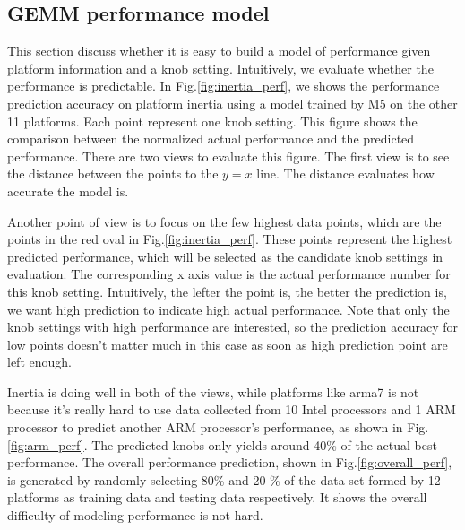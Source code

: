   \subsection{GEMM performance model}
  \label{sec:GEMMperf}
  This section discuss whether it is easy to build a model of \gem performance
  given platform information and a knob setting. Intuitively, we evaluate
  whether the \gem performance is predictable. In Fig.\ref{fig:inertia_perf},
  we shows the performance prediction accuracy on platform inertia using a model
  trained by M5 on the other 11 platforms. Each point represent one knob
  setting. This figure shows the comparison between the normalized actual
  performance and the predicted performance. There are two views to evaluate
  this figure. The first view is to see the distance between the points to the
  $y=x$ line. The distance evaluates how accurate the model is.

  Another point of
  view is to focus on the few highest data points, which are the points in the
  red oval in Fig.\ref{fig:inertia_perf}. These points represent the highest
  predicted performance, which will be selected as the candidate knob settings
  in \atl evaluation. The corresponding x axis value is the actual performance
  number for this knob setting. Intuitively, the lefter the point is, the
  better the prediction is, we want high prediction to indicate high actual
  performance. Note that only the knob settings with high performance are
  interested, so the prediction accuracy for low points doesn't matter much in
  this case as soon as high prediction point are left enough.

  Inertia is doing well in both of the views, while platforms like arma7 is not
  because it's really hard to use data collected from 10 Intel processors and 1
  ARM processor to predict another ARM processor's performance, as shown in
  Fig.\ref{fig:arm_perf}. The predicted knobs only yields around 40\% of the
  actual best performance.
  The overall performance prediction, shown in
  Fig.\ref{fig:overall_perf}, is generated by randomly selecting 80\% and 20 \%
  of the data set formed by 12 platforms as training data and testing data
  respectively. It shows the overall difficulty of modeling \gem performance
  is not hard.

